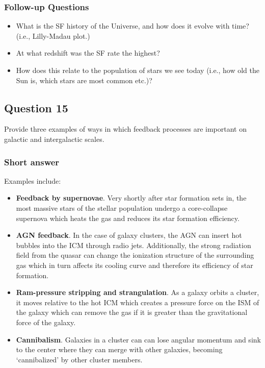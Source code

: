 \documentclass[a4paper,10pt]{article}
\begin{document}
\subsubsection{Follow-up Questions}

\begin{itemize}
    \item What is the SF history of the Universe, and how does it evolve with time? (i.e., Lilly-Madau plot.)
    \item At what redshift was the SF rate the highest?
    \item How does this relate to the population of stars we see today (i.e., how old the Sun is, which stars are most common etc.)?
\end{itemize}


\newpage
\subsection{Question 15}

Provide three examples of ways in which feedback processes are important on galactic and intergalactic scales.

\subsubsection{Short answer}

Examples include:

\begin{itemize}
    \item \textbf{Feedback by supernovae}. Very shortly after star formation sets in, the most massive stars of the stellar population undergo a core-collapse supernova which heats the gas and reduces its star formation efficiency.
    \item \textbf{AGN feedback}. In the case of galaxy clusters, the AGN can insert hot bubbles into the ICM through radio jets. Additionally, the strong radiation field from the quasar can change the ionization structure of the surrounding gas which in turn affects its cooling curve and therefore its efficiency of star formation.
    \item \textbf{Ram-pressure stripping and strangulation}. As a galaxy orbits a cluster, it moves relative to the hot ICM which creates a pressure force on the ISM of the galaxy which can remove the gas if it is greater than the gravitational force of the galaxy.
    \item \textbf{Cannibalism}. Galaxies in a cluster can can lose angular momentum and sink to the center where they can merge with other galaxies, becoming `cannibalized' by other cluster members.
\end{itemize}
\end{document}
